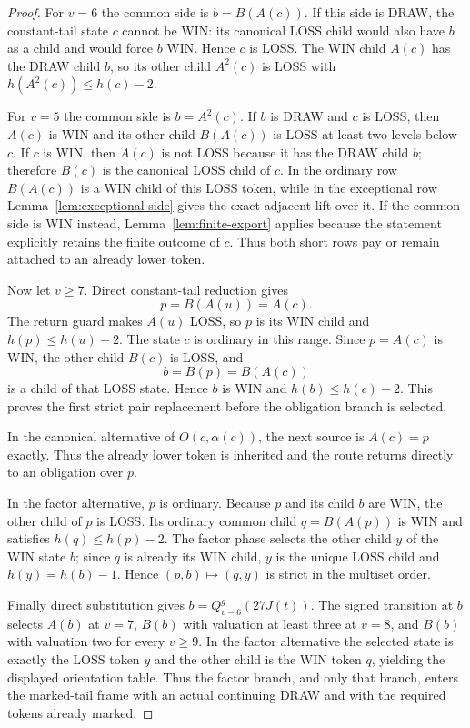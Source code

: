 \begin{proof}
For $v=6$ the common side is $b=B(A(c))$. If this side is DRAW, the
constant-tail state $c$ cannot be WIN: its canonical LOSS child would also
have $b$ as a child and would force $b$ WIN. Hence $c$ is LOSS. The WIN child
$A(c)$ has the DRAW child $b$, so its other child $A^2(c)$ is LOSS with
$h(A^2(c))\le h(c)-2$.

For $v=5$ the common side is $b=A^2(c)$. If $b$ is DRAW and $c$ is LOSS,
then $A(c)$ is WIN and its other child $B(A(c))$ is LOSS at least two levels
below $c$. If $c$ is WIN, then $A(c)$ is not LOSS because it has the DRAW
child $b$; therefore $B(c)$ is the canonical LOSS child of $c$. In the
ordinary row $B(A(c))$ is a WIN child of this LOSS token, while in the
exceptional row Lemma~\ref{lem:exceptional-side} gives the exact adjacent
lift over it. If the common side is WIN instead, Lemma~\ref{lem:finite-export}
applies because the statement explicitly retains the finite outcome of $c$.
Thus both short rows pay or remain attached to an already lower token.

Now let $v\ge7$. Direct constant-tail reduction gives
\[
 p=B(A(u))=A(c).
\]
The return guard makes $A(u)$ LOSS, so $p$ is its WIN child and
$h(p)\le h(u)-2$. The state $c$ is ordinary in this range. Since $p=A(c)$
is WIN, the other child $B(c)$ is LOSS, and
\[
 b=B(p)=B(A(c))
\]
is a child of that LOSS state. Hence $b$ is WIN and
$h(b)\le h(c)-2$. This proves the first strict pair replacement before the
obligation branch is selected.

In the canonical alternative of $O(c,\alpha(c))$, the next source is
$A(c)=p$ exactly. Thus the already lower token is inherited and the route
returns directly to an obligation over $p$.

In the factor alternative, $p$ is ordinary. Because $p$ and its child $b$
are WIN, the other child of $p$ is LOSS. Its ordinary common child
$q=B(A(p))$ is WIN and satisfies $h(q)\le h(p)-2$. The factor phase selects
the other child $y$ of the WIN state $b$; since $q$ is already its WIN child,
$y$ is the unique LOSS child and $h(y)=h(b)-1$. Hence
$(p,b)\mapsto(q,y)$ is strict in the multiset order.

Finally direct substitution gives $b=Q_{v-6}^g(27J(t))$. The signed
transition at $b$ selects $A(b)$ at $v=7$, $B(b)$ with valuation at least
three at $v=8$, and $B(b)$ with valuation two for every $v\ge9$. In the
factor alternative the selected state is exactly the LOSS token $y$ and the
other child is the WIN token $q$, yielding the displayed orientation table.
Thus the factor branch, and only that branch, enters the marked-tail frame
with an actual continuing DRAW and with the required tokens already marked.
\end{proof}

